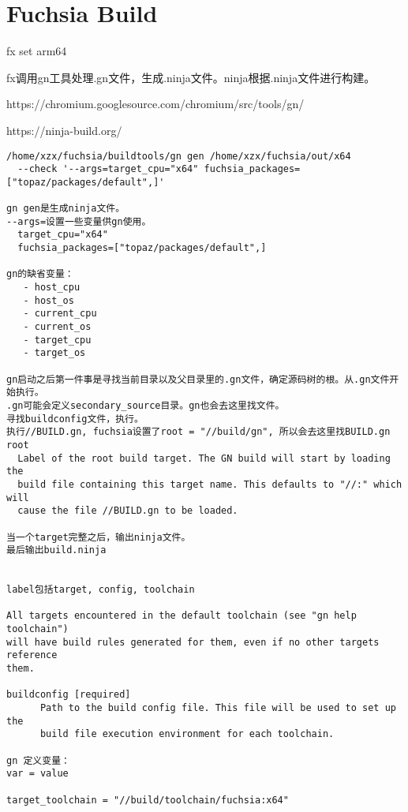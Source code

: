 \section{Fuchsia Build}

fx set arm64

fx调用gn工具处理.gn文件，生成.ninja文件。ninja根据.ninja文件进行构建。

https://chromium.googlesource.com/chromium/src/tools/gn/

https://ninja-build.org/

\begin{verbatim}
/home/xzx/fuchsia/buildtools/gn gen /home/xzx/fuchsia/out/x64 
  --check '--args=target_cpu="x64" fuchsia_packages=["topaz/packages/default",]'

gn gen是生成ninja文件。
--args=设置一些变量供gn使用。
  target_cpu="x64" 
  fuchsia_packages=["topaz/packages/default",]

gn的缺省变量：
   - host_cpu
   - host_os
   - current_cpu
   - current_os
   - target_cpu
   - target_os

gn启动之后第一件事是寻找当前目录以及父目录里的.gn文件，确定源码树的根。从.gn文件开始执行。
.gn可能会定义secondary_source目录。gn也会去这里找文件。
寻找buildconfig文件，执行。
执行//BUILD.gn, fuchsia设置了root = "//build/gn", 所以会去这里找BUILD.gn
root  
  Label of the root build target. The GN build will start by loading the
  build file containing this target name. This defaults to "//:" which will
  cause the file //BUILD.gn to be loaded.

当一个target完整之后，输出ninja文件。
最后输出build.ninja


label包括target, config, toolchain

All targets encountered in the default toolchain (see "gn help toolchain")
will have build rules generated for them, even if no other targets reference
them.

buildconfig [required]
      Path to the build config file. This file will be used to set up the
      build file execution environment for each toolchain.

gn 定义变量：
var = value

target_toolchain = "//build/toolchain/fuchsia:x64"
\end{verbatim}